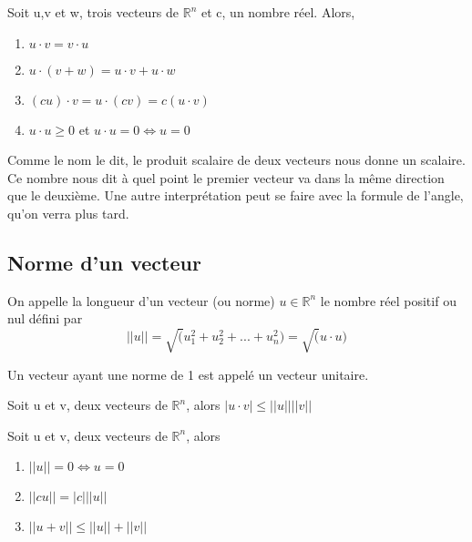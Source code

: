 \documentclass{article}
\begin{document}
\begin{theorem}
    Soit u,v et w, trois vecteurs de $\mathbb{R}^n$ et c, un nombre réel.
    Alors,
    \begin{enumerate}
	\item $ u \cdot v = v \cdot u$
	\item $ u \cdot (v+w) = u \cdot v + u \cdot w$
	\item $(cu) \cdot v = u \cdot (cv) = c(u \cdot v)$
	\item $ u \cdot u \geq 0$ et $ u \cdot u = 0 \Longleftrightarrow
	    u = 0$
    \end{enumerate}
\end{theorem}

\begin{remark}
    Comme le nom le dit, le produit scalaire de deux vecteurs nous donne
    un scalaire. Ce nombre nous dit à quel point le premier vecteur va
    dans la même direction que le deuxième. Une autre interprétation peut
    se faire avec la formule de l'angle, qu'on verra plus tard.
\end{remark}

\subsection{Norme d'un vecteur}

\begin{theorem}
    On appelle la longueur d'un vecteur (ou norme) $u \in \mathbb{R}^n$
    le nombre réel positif ou nul défini par
    $$ || u|| = \sqrt(u_1 ^2 + u_2 ^2 + ... + u_n^2) = \sqrt(u \cdot u)$$
\end{theorem}

\begin{definition}
    Un vecteur ayant une norme de 1 est appelé un vecteur unitaire.
\end{definition}

\begin{intuition}
\end{intuition}

\begin{theorem}
    Soit u et v, deux vecteurs de $\mathbb{R}^n$, alors
    $ | u \cdot v | \leq ||u|| ||v||$
\end{theorem}

\begin{theorem}
    Soit u et v, deux vecteurs de $\mathbb{R}^n$, alors
    \begin{enumerate}
	\item $ ||u||=0 \Longleftrightarrow u=0$
	\item $ ||cu|| = |c| ||u||$
	\item $ || u+v || \leq ||u||+||v||$
    \end{enumerate}
\end{theorem}
\end{document}
